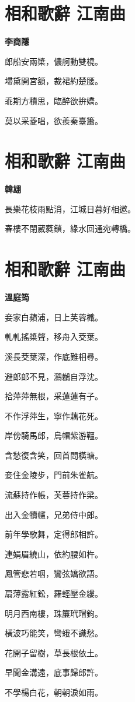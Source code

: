 \documentclass[12pt,a4paper]{ctexbook}
\begin{document}
\section{相和歌辭 江南曲}
\textbf{李商隱}\par\vspace{0.5em}
郎船安兩槳，儂舸動雙橈。\par
埽黛開宮額，裁裙約楚腰。\par
乖期方積思，臨醉欲拚嬌。\par
莫以采菱唱，欲羨秦臺簫。\par

\section{相和歌辭 江南曲}
\textbf{韓翃}\par\vspace{0.5em}
長樂花枝雨點消，江城日暮好相邀。\par
春樓不閉葳蕤鎖，綠水回通宛轉橋。\par

\section{相和歌辭 江南曲}
\textbf{溫庭筠}\par\vspace{0.5em}
妾家白蘋浦，日上芙蓉檝。\par
軋軋搖槳聲，移舟入茭葉。\par
溪長茭葉深，作底難相尋。\par
避郎郎不見，鸂鶒自浮沈。\par
拾萍萍無根，采蓮蓮有子。\par
不作浮萍生，寧作藕花死。\par
岸傍騎馬郎，烏帽紫游韁。\par
含愁復含笑，回首問橫塘。\par
妾住金陵步，門前朱雀航。\par
流蘇持作帳，芙蓉持作梁。\par
出入金犢幰，兄弟侍中郎。\par
前年學歌舞，定得郎相許。\par
連娟眉繞山，依約腰如杵。\par
鳳管悲若咽，鸞弦嬌欲語。\par
扇薄露紅鈆，羅輕壓金縷。\par
明月西南樓，珠簾玳瑁鉤。\par
橫波巧能笑，彎蛾不識愁。\par
花開子留樹，草長根依土。\par
早聞金溝遠，底事歸郎許。\par
不學楊白花，朝朝淚如雨。\par
\end{document}
